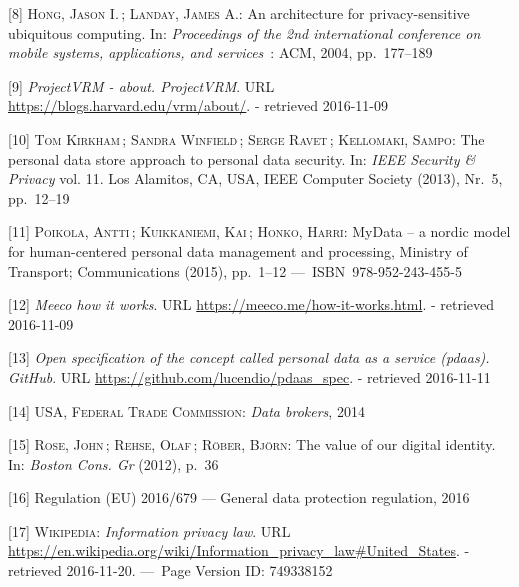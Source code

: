 \documentclass[12pt,english,a4paper,titlepage,cleardoublepage=empty,dottedtoc]{report}
\begin{document}
\hypertarget{ref-study_2004_architecture-for-privacy-sensitive-ubiquitous-computing}{}
{[}8{]} \textsc{Hong, Jason I.}\,; \textsc{Landay, James A.}: An
architecture for privacy-sensitive ubiquitous computing. In:
\emph{Proceedings of the 2nd international conference on mobile systems,
applications, and services}~: ACM, 2004, pp.~177--189

\hypertarget{ref-web_2010_projectvrm_about}{}
{[}9{]} \emph{ProjectVRM - about. ProjectVRM}. URL
\url{https://blogs.harvard.edu/vrm/about/}. - retrieved 2016-11-09

\hypertarget{ref-paper_2013_the-personal-data-store-approach-to-personal-data-security_2013}{}
{[}10{]} \textsc{Tom Kirkham}\,; \textsc{Sandra Winfield}\,;
\textsc{Serge Ravet}\,; \textsc{Kellomaki, Sampo}: The personal data
store approach to personal data security. In: \emph{IEEE Security \&
Privacy} vol. 11. Los Alamitos, CA, USA, IEEE Computer Society (2013),
Nr.~5, pp.~12--19

\hypertarget{ref-whitepaper_2014_mydata-a-nordic-model-for-human-centered-personal-data-management-and-processing}{}
{[}11{]} \textsc{Poikola, Antti}\,; \textsc{Kuikkaniemi, Kai}\,;
\textsc{Honko, Harri}: MyData -- a nordic model for human-centered
personal data management and processing, Ministry of Transport;
Communications (2015), pp.~1--12 ---~ISBN~978-952-243-455-5

\hypertarget{ref-web_2016_meeco-how-it-works}{}
{[}12{]} \emph{Meeco how it works}. URL
\url{https://meeco.me/how-it-works.html}. - retrieved 2016-11-09

\hypertarget{ref-repo_2016_pdaas-spec}{}
{[}13{]} \emph{Open specification of the concept called personal data as
a service (pdaas). GitHub}. URL
\url{https://github.com/lucendio/pdaas_spec}. - retrieved 2016-11-11

\hypertarget{ref-report_2014_data-brokers}{}
{[}14{]} \textsc{USA, Federal Trade Commission}: \emph{Data brokers},
2014

\hypertarget{ref-whitepaper_2012_the-value-of-our-digital-identity_definition}{}
{[}15{]} \textsc{Rose, John}\,; \textsc{Rehse, Olaf}\,; \textsc{Röber,
Björn}: The value of our digital identity. In: \emph{Boston Cons. Gr}
(2012), p.~36

\hypertarget{ref-regulation_2016_eu_general-data-protection-regulation_definition}{}
{[}16{]} Regulation (EU) 2016/679 --- General data protection
regulation, 2016

\hypertarget{ref-web_2016_wikipedia_information-privacy-law_us}{}
{[}17{]} \textsc{Wikipedia}: \emph{Information privacy law}. URL
\url{https://en.wikipedia.org/wiki/Information_privacy_law\#United_States}.
- retrieved 2016-11-20. ---~Page Version ID: 749338152
\end{document}
